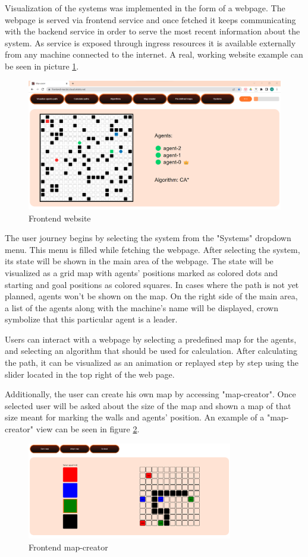 Visualization of the systems was implemented in the form of a webpage. The webpage is served via frontend service and once fetched it keeps communicating with the backend service in order to serve the most recent information about the system. As service is exposed through ingress resources it is available externally from any machine connected to the internet. A real, working website example can be seen in picture \ref{fig:frontend}.

\begin{figure}[H]
    \centering
    \includegraphics[width=\textwidth]{pictures/frontend.png}
    \caption{ Frontend website } 
    \label{fig:frontend}
\end{figure}

The user journey begins by selecting the system from the "Systems" dropdown menu. This menu is filled  while fetching the webpage. After selecting the system, its state will be shown in the main area of the webpage. The state will be visualized as a grid map with agents' positions marked as colored dots and starting and goal positions as colored squares. In cases where the path is not yet planned, agents won't be shown on the map. On the right side of the main area, a list of the agents along with the machine's name will be displayed, crown symbolize that this particular agent is a leader.

Users can interact with a webpage by selecting a predefined map for the agents, and selecting an algorithm that should be used for calculation. After calculating the path, it can be visualized as an animation or replayed step by step using the slider located in the top right of the web page.

Additionally, the user can create his own map by accessing "map-creator". Once selected user will be asked about the size of the map and shown a map of that size meant for marking the walls and agents' position. An example of a "map-creator" view can be seen in figure \ref{fig:map-creator}.

\begin{figure}[H]
    \centering
    \includegraphics[width=0.8\textwidth]{pictures/map-creator.png}
    \caption{ Frontend map-creator } 
    \label{fig:map-creator}
\end{figure}
